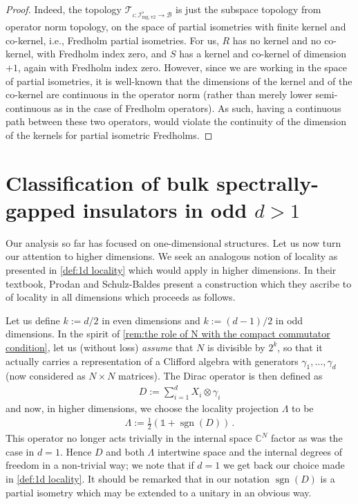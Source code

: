 \documentclass[a4paper,10pt]{article}
\numberwithin{equation}{section}
\theoremstyle{plain}
\theoremstyle{plain}
\theoremstyle{plain}
\theoremstyle{plain}
\theoremstyle{plain}
\theoremstyle{remark}
\theoremstyle{definition}
\theoremstyle{plain}
\newcommand{\CC}{\mathbb{C}}
\newcommand{\calB}{\mathcal{B}}
\newcommand{\calI}{\mathcal{I}}
\newcommand{\Id}{\mathds{1}}
\newcommand{\sgn}{\operatorname{sgn}}
\newcommand{\eql}[1]{\begin{align}#1\end{align}}
\newcommand{\calT}{\mathcal{T}}
\begin{document}
\begin{proof}
		Indeed, the topology $\calT_{\iota:\calI^\flat_{\mathrm{mg,v2}}\to\calB}$ is just the subspace topology from operator norm topology, on the space of partial isometries with finite kernel and co-kernel, i.e., Fredholm partial isometries. For us, $R$ has no kernel and no co-kernel, with Fredholm index zero, and $S$ has a kernel and co-kernel of dimension $+1$, again with Fredholm index zero. However, since we are working in the space of partial isometries, it is well-known \cite[Problem 130]{halmos1982hilbert} that the dimensions of the kernel and of the co-kernel are continuous in the operator norm (rather than merely lower semi-continuous as in the case of Fredholm operators). As such, having a continuous path between these two operators, would violate the continuity of the dimension of the kernels for partial isometric Fredholms.
	\end{proof}
	
	\section{Classification of bulk spectrally-gapped insulators in odd $d>1$}\label{sec:higher odd d}
	
	Our analysis so far has focused on one-dimensional structures. Let us now turn our attention to higher dimensions. We seek an analogous notion of locality as presented in \cref{def:1d locality} which would apply in higher dimensions. In their textbook, Prodan and Schulz-Baldes \cite[Chapter 6]{PSB_2016} present a construction which they ascribe to \cite{Connes1994,Garcia2000} of locality in all dimensions which proceeds as follows.
	
	Let us define $k:=d/2$ in even dimensions and $k:=(d-1)/2$ in odd dimensions. In the spirit of \cref{rem:the role of N with the compact commutator condition}, let us (without loss) \emph{assume} that $N$ is divisible by $2^k$, so that it actually carries a representation of a Clifford algebra with generators $\gamma_1,\dots,\gamma_d$ (now considered as $N\times N$ matrices). The Dirac operator is then defined as \eql{ D := \sum_{i=1}^d X_i \otimes \gamma_i} and now, in higher dimensions, we choose the locality projection $\Lambda$ to be \eql{\label{eq:Dirac projection}\Lambda := \frac{1}{2}\left(\Id+\sgn(D)\right)\,.} This operator no longer acts trivially in the internal space $\CC^N$ factor as was the case in $d=1$. Hence $D$ and both $\Lambda$ intertwine space and the internal degrees of freedom in a non-trivial way; we note that if $d=1$ we get back our choice made in \cref{def:1d locality}. It should be remarked that in our notation $\sgn(D)$ is a partial isometry which may be extended to a unitary in an obvious way.
	
\end{document}
